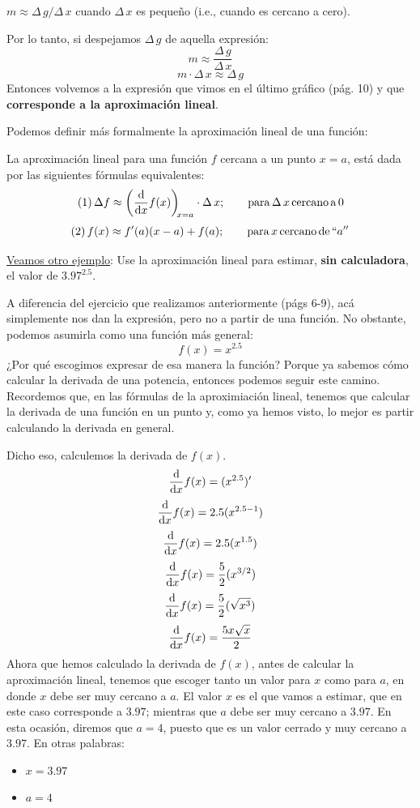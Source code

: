\documentclass[12pt]{article}
\begin{document}
\centerline{$m \approx \Delta \, g/\Delta \, x$ cuando $\Delta \, x$ es pequeño (i.e., cuando es cercano a cero).}

Por lo tanto, si despejamos $\Delta \, g$ de aquella expresión:
\[m \approx \frac{\Delta \, g}{\Delta \, x}\]
\[m \cdot \Delta \, x \approx \Delta \, g\]
Entonces volvemos a la expresión que vimos en el último gráfico (pág. 10) y que \textbf{corresponde a la aproximación lineal}.

Podemos definir más formalmente la aproximación lineal de una función:

La aproximación lineal para una función $f$ cercana a un punto $x = a$, está dada por las siguientes fórmulas equivalentes:
\[\mathrm{(1)} \, \Delta f \approx \diff*{f(x)}x[x=a] \cdot \Delta \, x; \qquad \mathrm{para} \, \Delta \, x \, \mathrm{cercano} \, \mathrm{a} \, 0\]
\[\mathrm{(2)} \, f(x) \approx f'(a)(x - a) + f(a); \qquad \mathrm{para} \, x \, \mathrm{cercano} \, \mathrm{de} \, ``a''\]

\underline{Veamos otro ejemplo}: Use la aproximación lineal para estimar, \textbf{sin calculadora}, el valor de $3.97^{2.5}$.

A diferencia del ejercicio que realizamos anteriormente (págs 6-9), acá simplemente nos dan la expresión, pero no a partir de una función. No obstante, podemos asumirla como una función más general:
\[f(x) = x ^{2.5}\]
¿Por qué escogimos expresar de esa manera la función? Porque ya sabemos cómo calcular la derivada de una potencia, entonces podemos seguir este camino. Recordemos que, en las fórmulas de la aproximiación lineal, tenemos que calcular la derivada de una función en un punto y, como ya hemos visto, lo mejor es partir calculando la derivada en general.

Dicho eso, calculemos la derivada de $f(x)$.
\[\diff*{f(x)}x = (x^{2.5})'\]
\[\diff*{f(x)}x = 2.5(x^{2.5 - 1})\]
\[\diff*{f(x)}x = 2.5(x^{1.5})\]
\[\diff*{f(x)}x = \frac{5}{2}(x^{3/2})\]
\[\diff*{f(x)}x = \frac{5}{2}(\sqrt{x^{3}})\]
\[\diff*{f(x)}x = \frac{5x \sqrt{x}}{2}\]
Ahora que hemos calculado la derivada de $f(x)$, antes de calcular la aproximación lineal, tenemos que escoger tanto un valor para $x$ como para $a$, en donde $x$ debe ser muy cercano a $a$. El valor $x$ es el que vamos a estimar, que en este caso corresponde a $3.97$; mientras que $a$ debe ser muy cercano a $3.97$. En esta ocasión, diremos que $a = 4$, puesto que es un valor cerrado y muy cercano a $3.97$. En otras palabras:

\begin{itemize}
\item $x = 3.97$
\item $a = 4$
\end{itemize}
\end{document}
